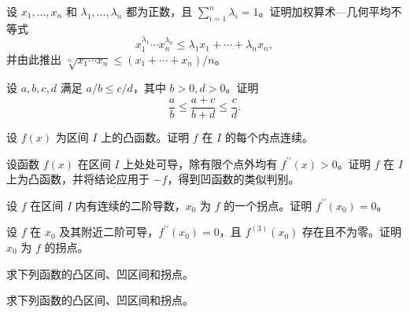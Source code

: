 \noindent\begin{minipage}{\textwidth}
设 $x_1,\ldots,x_n$ 和 $\lambda_1,\ldots,\lambda_n$ 都为正数，且 $\sum_{i=1}^n\lambda_i=1$。证明加权算术—几何平均不等式\[x_1^{\lambda_1}\cdots x_n^{\lambda_n}\le\lambda_1x_1+\cdots+\lambda_nx_n,\]并由此推出 $\sqrt[n]{x_1\cdots x_n}\le(x_1+\cdots+x_n)/n$。
\end{minipage}\par\vfill
\newpage
\noindent\begin{minipage}{\textwidth}
设 $a,b,c,d$ 满足 $a/b\le c/d$，其中 $b>0,d>0$。证明\[\frac ab\le\frac{a+c}{b+d}\le\frac cd.\]
\end{minipage}\par\vfill
\noindent\begin{minipage}{\textwidth}
设 $f(x)$ 为区间 $I$ 上的凸函数。证明 $f$ 在 $I$ 的每个内点连续。
\end{minipage}\par\vfill
\noindent\begin{minipage}{\textwidth}
设函数 $f(x)$ 在区间 $I$ 上处处可导，除有限个点外均有 $f^{\prime\prime}(x)>0$。证明 $f$ 在 $I$ 上为凸函数，并将结论应用于 $-f$，得到凹函数的类似判别。
\end{minipage}\par\vfill
\noindent\begin{minipage}{\textwidth}
设 $f$ 在区间 $I$ 内有连续的二阶导数，$x_0$ 为 $f$ 的一个拐点。证明 $f^{\prime\prime}(x_0)=0$。
\end{minipage}\par\vfill
\newpage
\noindent\begin{minipage}{\textwidth}
设 $f$ 在 $x_0$ 及其附近二阶可导，$f^{\prime\prime}(x_0)=0$，且 $f^{(3)}(x_0)$ 存在且不为零。证明 $x_0$ 为 $f$ 的拐点。
\end{minipage}\par\vfill
\noindent\begin{minipage}{\textwidth}
求下列函数的凸区间、凹区间和拐点。
\end{minipage}\par\vfill
\noindent\begin{minipage}{\textwidth}
求下列函数的凸区间、凹区间和拐点。
\end{minipage}\par\vfill
